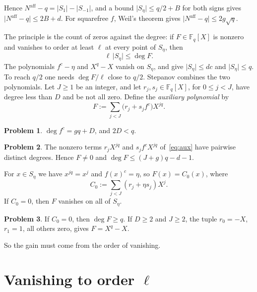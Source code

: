 \documentclass[reqno]{amsart}
\theoremstyle{definition}
\newtheorem{problem}{Problem}[section]
\theoremstyle{plain}
\newcommand{\F}{\mathbb{F}}
\newcommand{\Naff}{N^{\mathrm{aff}}}
\begin{document}
Hence \(\Naff - q = \lvert S_1 \rvert - \lvert S_{-1} \rvert\), and a bound \(\lvert S_\eta \rvert \le q/2 + B\) for both signs gives \(\lvert \Naff - q \rvert \le 2B + d\).  For squarefree \(f\), Weil's theorem \cite{Wei48} gives \(\lvert \Naff - q \rvert \le 2g\sqrt q\).

The principle is the count of zeros against the degree: if \(F \in \F_q[X]\) is nonzero and vanishes to order at least \(\ell\) at every point of \(S_\eta\), then
\begin{equation}\label{eq:count}
  \ell\, \lvert S_\eta \rvert \le \deg F .
\end{equation}
The polynomials \(f^c - \eta\) and \(X^q - X\) vanish on \(S_\eta\), and give \(\lvert S_\eta \rvert \le dc\) and \(\lvert S_\eta \rvert \le q\).  To reach \(q/2\) one needs \(\deg F/\ell\) close to \(q/2\).  Stepanov combines the two polynomials.  Let \(J \ge 1\) be an integer, and let \(r_j, s_j \in \F_q[X]\), for \(0 \le j < J\), have degree less than \(D\) and be not all zero.  Define the \emph{auxiliary polynomial} by
\begin{equation}\label{eq:aux}
  F := \sum_{j<J} \bigl( r_j + s_j f^c \bigr) X^{jq} .
\end{equation}

\begin{problem}\label{pr:degE}
\(\deg f^c = gq + D\), and \(2D < q\).
\end{problem}

\begin{problem}\label{pr:nonzero}
The nonzero terms \(r_j X^{jq}\) and \(s_j f^c X^{jq}\) of~\eqref{eq:aux} have pairwise distinct degrees.  Hence \(F \ne 0\) and \(\deg F \le (J + g)q - d - 1\).
\end{problem}

For \(x \in S_\eta\) we have \(x^{jq} = x^j\) and \(f(x)^c = \eta\), so \(F(x) = C_0(x)\), where
\[
  C_0 := \sum_{j<J} (r_j + \eta s_j) X^j .
\]
If \(C_0 = 0\), then \(F\) vanishes on all of \(S_\eta\).

\begin{problem}\label{pr:order-one}
If \(C_0 = 0\), then \(\deg F \ge q\).  If \(D \ge 2\) and \(J \ge 2\), the tuple \(r_0 = -X\), \(r_1 = 1\), all others zero, gives \(F = X^q - X\).
\end{problem}

So the gain must come from the order of vanishing.

\section{Vanishing to order \texorpdfstring{\(\ell\)}{l}}\label{sec:order}
\end{document}
